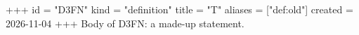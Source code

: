 +++
id = "D3FN"
kind = "definition"
title = "T"
aliases = ["def:old"]
created = 2026-11-04
+++
Body of D3FN: a made-up statement.
